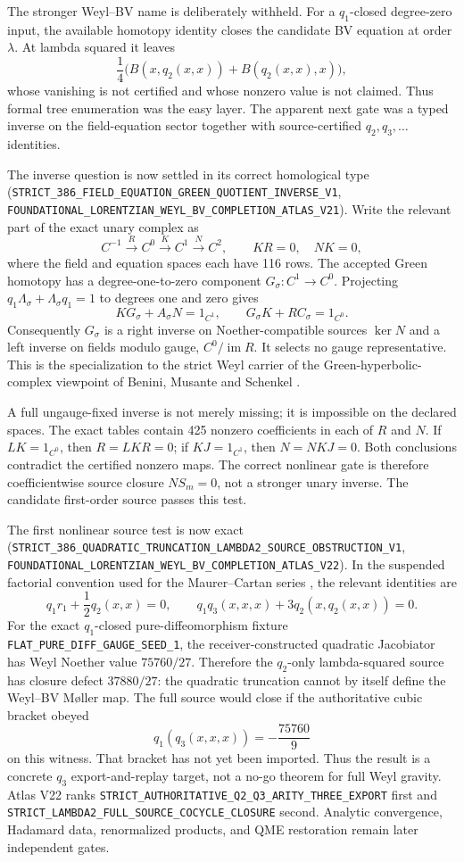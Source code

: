 \documentclass[11pt]{article}
\theoremstyle{definition}
\theoremstyle{remark}
\newcommand{\cert}[1]{\nolinkurl{#1}}
\begin{document}
The stronger Weyl--BV name is deliberately withheld.  For a $q_1$-closed
degree-zero input, the available homotopy identity closes the candidate BV
equation at order \(\lambda\).  At lambda squared it leaves
\[
 \frac14\bigl(B(x,q_2(x,x))+B(q_2(x,x),x)\bigr),
\]
whose vanishing is not certified and whose nonzero value is not claimed.
Thus formal tree enumeration was the easy layer.  The apparent next gate was
a typed inverse on the field-equation sector together with source-certified
$q_2,q_3,\ldots$ identities.

The inverse question is now settled in its correct homological type
(\cert{STRICT_386_FIELD_EQUATION_GREEN_QUOTIENT_INVERSE_V1},
\cert{FOUNDATIONAL_LORENTZIAN_WEYL_BV_COMPLETION_ATLAS_V21}).  Write the
relevant part of the exact unary complex as
\[
 C^{-1}\xrightarrow{R}C^0\xrightarrow{K}C^1\xrightarrow{N}C^2,
 \qquad KR=0,\quad NK=0,
\]
where the field and equation spaces each have 116 rows.  The accepted Green
homotopy has a degree-one-to-zero component
$G_\sigma:C^1\to C^0$.  Projecting
$q_1\Lambda_\sigma+\Lambda_\sigma q_1=1$ to degrees one and zero gives
\[
 KG_\sigma+A_\sigma N=1_{C^1},\qquad
 G_\sigma K+RC_\sigma=1_{C^0}.
\]
Consequently $G_\sigma$ is a right inverse on Noether-compatible sources
$\ker N$ and a left inverse on fields modulo gauge, $C^0/\operatorname{im}R$.
It selects no gauge representative.  This is the specialization to the
strict Weyl carrier of the Green-hyperbolic-complex viewpoint of Benini,
Musante and Schenkel \cite{BeniniMusanteSchenkel2024}.

A full ungauge-fixed inverse is not merely missing; it is impossible on the
declared spaces.  The exact tables contain 425 nonzero coefficients in each
of $R$ and $N$.  If $LK=1_{C^0}$, then $R=LKR=0$; if $KJ=1_{C^1}$, then
$N=NKJ=0$.  Both conclusions contradict the certified nonzero maps.  The
correct nonlinear gate is therefore coefficientwise source closure
$NS_m=0$, not a stronger unary inverse.  The candidate first-order source
passes this test.

The first nonlinear source test is now exact
(\cert{STRICT_386_QUADRATIC_TRUNCATION_LAMBDA2_SOURCE_OBSTRUCTION_V1},
\cert{FOUNDATIONAL_LORENTZIAN_WEYL_BV_COMPLETION_ATLAS_V22}).  In the
suspended factorial convention used for the Maurer--Cartan series
\cite{HohmZwiebach2017}, the relevant identities are
\[
 q_1r_1+\frac12q_2(x,x)=0,
 \qquad
 q_1q_3(x,x,x)+3q_2(x,q_2(x,x))=0.
\]
For the exact $q_1$-closed pure-diffeomorphism fixture
\cert{FLAT_PURE_DIFF_GAUGE_SEED_1}, the receiver-constructed quadratic
Jacobiator has Weyl Noether value $75760/27$.  Therefore the $q_2$-only
lambda-squared source has closure defect $37880/27$: the quadratic
truncation cannot by itself define the Weyl--BV Møller map.  The full source
would close if the authoritative cubic bracket obeyed
\[
 q_1(q_3(x,x,x))=-\frac{75760}{9}
\]
on this witness.  That bracket has not yet been imported.  Thus the result is
a concrete $q_3$ export-and-replay target, not a no-go theorem for full Weyl
gravity.  Atlas V22 ranks
\cert{STRICT_AUTHORITATIVE_Q2_Q3_ARITY_THREE_EXPORT} first and
\cert{STRICT_LAMBDA2_FULL_SOURCE_COCYCLE_CLOSURE} second.  Analytic convergence,
Hadamard data, renormalized products, and QME restoration remain later
independent gates.
\end{document}
